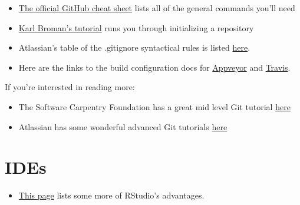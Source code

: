 \documentclass[
]{book}
\providecommand{\tightlist}{%
  \setlength{\itemsep}{0pt}\setlength{\parskip}{0pt}}
\begin{document}
\begin{itemize}
\tightlist
\item
  \href{https://github.github.com/training-kit/downloads/github-git-cheat-sheet.pdf}{The official GitHub cheat sheet} lists all of the general commands you'll need
\item
  \href{http://kbroman.org/github_tutorial/pages/init.html}{Karl Broman's tutorial} runs you through initializing a repository
\item
  Atlassian's table of the .gitignore syntactical rules is listed \href{https://www.atlassian.com/git/tutorials/gitignore}{here}.
\item
  Here are the links to the build configuration docs for \href{https://www.appveyor.com/docs/build-configuration/}{Appveyor} and \href{https://docs.travis-ci.com/user/languages/r/}{Travis}.
\end{itemize}

If you're interested in reading more:

\begin{itemize}
\tightlist
\item
  The Software Carpentry Foundation has a great mid level Git tutorial \href{https://swcarpentry.GitHub.io/git-novice/}{here}
\item
  Atlassian has some wonderful advanced Git tutorials \href{https://www.atlassian.com/git/tutorials/advanced-overview}{here}
\end{itemize}

\hypertarget{ides}{%
\section{IDEs}\label{ides}}

\begin{itemize}
\tightlist
\item
  \href{https://www.theanalysisfactor.com/the-advantages-of-rstudio/}{This page} lists some more of RStudio's advantages.
\end{itemize}
\end{document}
